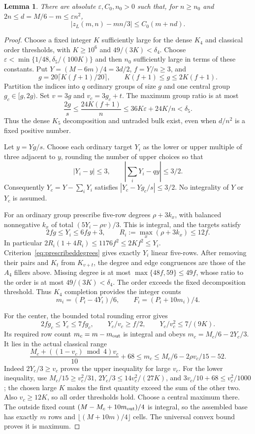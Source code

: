 \documentclass[11pt]{article}
\newtheorem{lemma}[theorem]{Lemma}
\newcommand{\zl}{z_L}
\begin{document}
\begin{lemma}\label{lem:quantitativecritical}
There are absolute $\varepsilon,C_0,n_0>0$ such that, for $n\ge n_0$
and $2n\le d=M/6-m\le\varepsilon n^2$,
\[
 \left|\zl(m,n)-mn/3\right|\le C_0(m+nd).
\]
\end{lemma}
\begin{proof}
Choose a fixed integer $K$ sufficiently large for the dense $K_4$ and
classical order thresholds, with $K\ge10^6$ and $49/(3K)<\delta_4$.
Choose $\varepsilon<\min\{1/48,\delta_5/(100K)\}$ and then $n_0$
sufficiently large in terms of these constants.
Put $Y=(M-6m)/4=3d/2$, $f=Y/n\ge3$, and
\[
 g=20\lceil K(f+1)/20\rceil,\qquad K(f+1)\le g\le2K(f+1).
\]
Partition the indices into $q$ ordinary groups of size $g$ and one
central group $g_c\in[g,2g)$. Set $v=3g$ and $v_c=3g_c+t$.
The maximum group ratio is at most
\[
 \frac{2g}{s}\le\frac{24K(f+1)}n
 \le36K\varepsilon+24K/n<\delta_5.
\]
Thus the dense $K_5$ decomposition and untraded bulk exist, even when
$d/n^2$ is a fixed positive number.

Let $y=Yg/s$. Choose each ordinary target $Y_i$ as the lower or upper
multiple of three adjacent to $y$, rounding the number of upper choices
so that
\[
 |Y_i-y|\le3,\qquad
 \left|\sum_iY_i-qy\right|\le3/2.
\]
Consequently $Y_c=Y-\sum_iY_i$ satisfies
$|Y_c-Yg_c/s|\le3/2$. No integrality of $Y$ or $Y_c$ is assumed.

For an ordinary group prescribe five-row degrees $\rho+3k_x$, with
balanced nonnegative $k_x$ of total $(5Y_i-\rho v)/3$.
This is integral, and the targets satisfy
\[
 2fg\le Y_i\le6fg+3,\qquad R_i:=\max_x(\rho+3k_x)\le12f.
\]
In particular
$2R_i(1+4R_i)\le1176f^2\le2Kf^2\le Y_i$.
Criterion~\eqref{eq:prescribeddegrees} gives exactly $Y_i$ linear five-rows.
After removing their pairs and $K_t$ from $K_{v+t}$, the degree and edge
congruences are those of the $A_4$ fillers above. Missing degree is at
most $\max\{48f,59\}\le49f$, whose ratio to the order is at most
$49/(3K)<\delta_4$.
The order exceeds the fixed decomposition threshold. Thus $K_4$ completion
provides the integer counts
\[
 m_i=(P_i-4Y_i)/6,\qquad F_i=(P_i+10m_i)/4.
\]

For the center, the bounded total rounding error gives
\[
 2fg_c\le Y_c\le7fg_c,\qquad
 Y_c/v_c\ge f/2,\qquad Y_c/v_c^2\le7/(9K).
\]
Its required row count $m_c=m-m_{\rm out}$ is integral and obeys
$m_c=M_c/6-2Y_c/3$. It lies in the actual classical range
\[
 \frac{M_c+((1-v_c)\bmod4)v_c}{10}+68
 \le m_c\le M_c/6-2\rho v_c/15-52.
\]
Indeed $2Y_c/3\ge v_c$ proves the upper inequality for large $v_c$.
For the lower inequality, use
$M_c/15\ge v_c^2/31$,
$2Y_c/3\le14v_c^2/(27K)$, and
$3v_c/10+68\le v_c^2/1000$; the chosen large $K$ makes the first
quantity exceed the sum of the other two. Also $v_c\ge12K$, so all
order thresholds hold. Choose a central maximum there.
The outside fixed count $(M-M_c+10m_{\rm out})/4$ is integral, so the
assembled base has exactly $m$ rows and $\lfloor(M+10m)/4\rfloor$ cells.
The universal convex bound proves it is maximum.


\end{proof}
\end{document}
